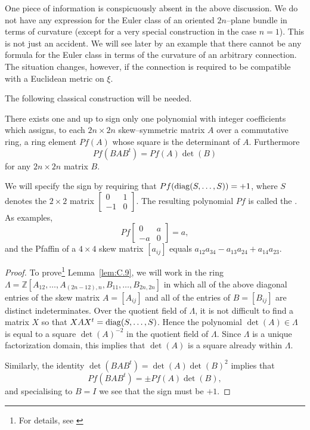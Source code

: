 \documentclass[../main]{subfiles}
\begin{document}
One piece of information is conspicuously absent in the above discussion. We do not have any expression for the Euler class of an oriented $2n$--plane bundle in terms of curvature (except for a very special construction in the case $n=1$). This is not just an accident. We will see later by an example that there cannot be any formula for the Euler class in terms of the curvature of an arbitrary connection. The situation changes, however, if the connection is required to be compatible with a Euclidean metric on $\xi$.

The following classical construction will be needed. 

\begin{lemma}
\label{lem:C.9}
There exists one and up to sign only one polynomial with integer coefficients which assigns, to each $2n \times 2n$ skew--symmetric matrix $A$ over a commutative ring, a ring element $P f(A)$ whose square is the determinant of $A$. Furthermore \[Pf(BAB^t) = Pf(A) \det(B)\] for any $2n \times 2n$ matrix $B$. 
\end{lemma}

We will specify the sign by requiring that $Pf(\operatorname{diag}(S, \ldots, S)) = +1$, where $S$ denotes the $2 \times 2$ matrix $\begin{bmatrix}0 & 1 \\ -1 & 0\end{bmatrix}$. The resulting polynomial $P f$ is called the . As examples, \[Pf \begin{bmatrix}0 & a \\ -a & 0\end{bmatrix} = a,\] and the Pfaffin of a $4 \times 4$ skew matrix $[a_{ij}]$ equals $a_{12} a_{34} - a_{13} a_{24} + a_{14} a_{23}$.

\begin{proof}
To prove\footnote{For details, see \cite[chapter 9, p. 82]{bourbaki1998algebra}} Lemma~\ref{lem:C.9}, we will work in the ring\newline $\Lambda = \mathbb Z[A_{12}, \ldots, A_{(2n - 12),n}, B_{11}, \ldots, B_{2n, 2n}]$ in which all of the above diagonal entries of the skew matrix $A = [A_{ij}]$ and all of the entries of $B = [B_{ij}]$ are distinct indeterminates. Over the quotient field of $\Lambda$, it is not difficult to find a matrix $X$ so that $X A X^t = \operatorname{diag}(S, \ldots, S)$. Hence the polynomial $\det(A) \in \Lambda$ is equal to a square $\det(A)^{-2}$ in the quotient field of $\Lambda$. Since $\Lambda$ is a unique factorization domain, this implies that $\det(A)$ is a square already within $\Lambda$. 

Similarly, the identity $\det(BAB^t) = \det(A) \det(B)^2$ implies that \[Pf(BAB^t) = \pm Pf(A) \det(B),\] and specialising to $B = I$ we see that the sign must be $+1$. 
\end{proof}
\end{document}
